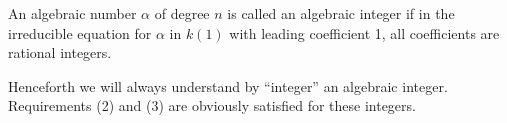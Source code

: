 An algebraic number $\alpha$ of degree $n$ is called an algebraic integer if in the irreducible equation for $\alpha$ in $k(1)$ with leading coefficient 1, all coefficients are rational integers.

Henceforth we will always understand by “integer” an algebraic integer. Requirements (2) and (3) are obviously satisfied for these integers.
